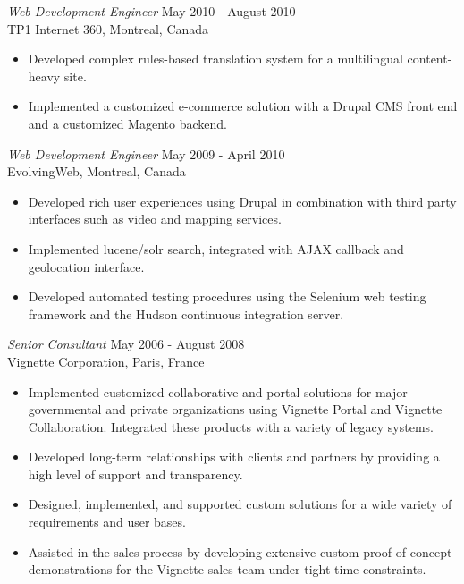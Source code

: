 \documentclass[line,margin]{res}
\begin{document}
\begin{resume}
{\sl Web Development Engineer} \hfill May 2010 - August 2010\\
                TP1 Internet 360, 
                Montreal, Canada
                 \begin{itemize}  \itemsep -2pt %
                 \item Developed complex rules-based translation system for a
                 multilingual content-heavy site.
                 \item Implemented a customized e-commerce solution with a
                 Drupal CMS front end and a customized Magento backend.
                 \end{itemize}

{\sl Web Development Engineer} \hfill May 2009 - April 2010\\
                EvolvingWeb, 
                Montreal, Canada
                 \begin{itemize}  \itemsep -2pt %
                 \item Developed rich user experiences using Drupal in
                 combination with third party interfaces such as video and
                 mapping services.
                 \item Implemented lucene/solr search, integrated with AJAX
                 callback and geolocation interface.
                 \item Developed automated testing procedures using the
                 Selenium web testing framework and the Hudson continuous
                 integration server.
                 \end{itemize}
                
{\sl Senior Consultant} \hfill May 2006 - August 2008\\
                Vignette Corporation, 
                Paris, France
                 \begin{itemize}  \itemsep -2pt %
                 \item Implemented customized collaborative and portal solutions for major governmental and private organizations using Vignette Portal and Vignette Collaboration. Integrated these products with a variety of legacy systems. 
                \item Developed long-term relationships with clients and partners by providing a high level of support and transparency.
                \item Designed, implemented, and supported custom solutions for
                a wide variety of requirements and user bases. 
				\item Assisted in the sales process by developing extensive custom proof of concept demonstrations for the Vignette sales team under tight time constraints.
                \end{itemize}
                                    

\end{resume}
\end{document}
